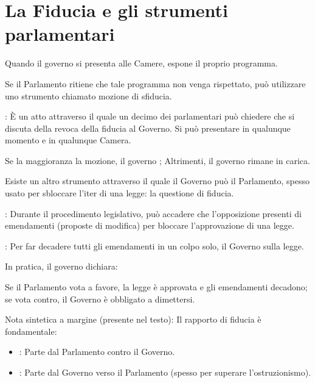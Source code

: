 \documentclass[letterpaper,10pt,italian]{sphinxmanual}
\begin{document}
\sphinxstepscope


\chapter{La Fiducia e gli strumenti parlamentari}
\label{\detokenize{La Fiducia e gli strumenti parlamentari:la-fiducia-e-gli-strumenti-parlamentari}}\label{\detokenize{La Fiducia e gli strumenti parlamentari::doc}}
\sphinxAtStartPar
Quando il governo si presenta alle Camere, espone il proprio programma.

\sphinxAtStartPar
Se il Parlamento ritiene che tale programma non venga rispettato, può utilizzare uno strumento chiamato mozione di
sfiducia.

\sphinxAtStartPar
{}: È un atto attraverso il quale un decimo dei parlamentari può chiedere che si discuta
della revoca della fiducia al Governo.
Si può presentare in qualunque momento e in qualunque Camera.

\sphinxAtStartPar
Se la maggioranza  la mozione, il governo ;
Altrimenti, il governo rimane in carica.

\sphinxAtStartPar
{}

\sphinxAtStartPar
Esiste un altro strumento attraverso il quale il Governo può  il Parlamento, spesso usato per sbloccare
l’iter di una legge: la questione di fiducia.

\sphinxAtStartPar
{}: Durante il procedimento legislativo, può accadere che l’opposizione presenti  di emendamenti (proposte di modifica) per bloccare l’approvazione di una legge.

\sphinxAtStartPar
{}: Per far decadere tutti gli emendamenti in un colpo solo, il Governo 
sulla legge.

\sphinxAtStartPar
In pratica, il governo dichiara: 

\sphinxAtStartPar
Se il Parlamento vota a favore, la legge è approvata e gli emendamenti decadono; se vota contro, il Governo è obbligato a dimettersi.

\sphinxAtStartPar
Nota sintetica a margine (presente nel testo):
Il rapporto di fiducia è fondamentale:
\begin{itemize}
\item {} 
\sphinxAtStartPar
{}: Parte dal Parlamento contro il Governo.

\item {} 
\sphinxAtStartPar
{}: Parte dal Governo verso il Parlamento (spesso per superare l’ostruzionismo).

\end{itemize}
\end{document}

